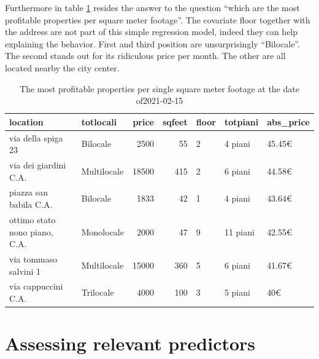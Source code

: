 \documentclass[
  12pt,
  a4paper,
  oneside]{book}
\theoremstyle{definition}
\theoremstyle{definition}
\theoremstyle{definition}
\theoremstyle{remark}
\begin{document}
Furthermore in table \ref{tab:TopAbsPrice} resides the answer to the question ``which are the most profitable properties per square meter footage''. The covariate floor together with the address are not part of this simple regression model, indeed they can help explaining the behavior. First and third position are unsurprisingly ``Bilocale''. The second stands out for its ridiculous price per month. The other are all located nearby the city center.

\begin{table}

\caption{\label{tab:TopAbsPrice}The most profitable properties per single square meter footage at the date of2021-02-15}
\centering
\begin{tabular}[t]{llrrlll}
\toprule
location & totlocali & price & sqfeet & floor & totpiani & abs\_price\\
\midrule
via della spiga 23 & Bilocale & 2500 & 55 & 2 & 4 piani & 45.45€\\
via dei giardini C.A. & Multilocale & 18500 & 415 & 2 & 6 piani & 44.58€\\
piazza san babila C.A. & Bilocale & 1833 & 42 & 1 & 4 piani & 43.64€\\
ottimo stato nono piano, C.A. & Monolocale & 2000 & 47 & 9 & 11 piani & 42.55€\\
via tommaso salvini 1 & Multilocale & 15000 & 360 & 5 & 6 piani & 41.67€\\
\addlinespace
via cappuccini C.A. & Trilocale & 4000 & 100 & 3 & 5 piani & 40€\\
\bottomrule
\end{tabular}
\end{table}

\hypertarget{assessing-relevant-predictors}{%
\section{Assessing relevant predictors}\label{assessing-relevant-predictors}}
\end{document}
